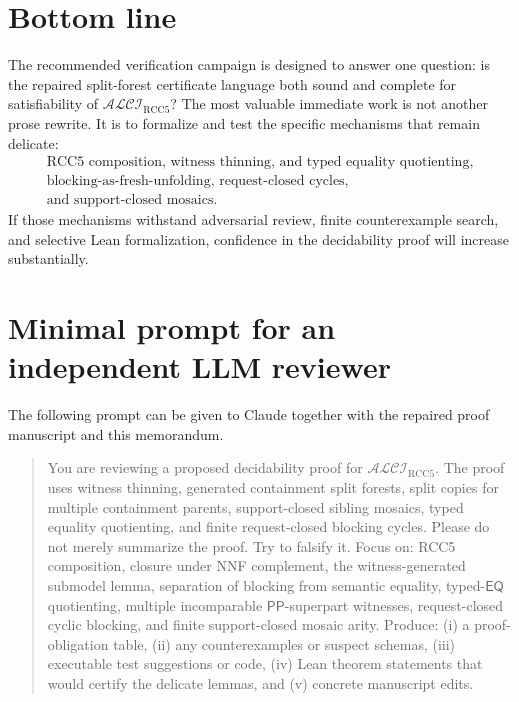 \documentclass[11pt]{article}
\newcommand{\ALCIRCC}{\ensuremath{\mathcal{ALCI}_{\mathrm{RCC5}}}}
\newcommand{\EQ}{\mathsf{EQ}}
\newcommand{\PP}{\mathsf{PP}}
\theoremstyle{definition}
\theoremstyle{plain}
\begin{document}
\section{Bottom line}

The recommended verification campaign is designed to answer one question: is the repaired split-forest certificate language both sound and complete for satisfiability of \ALCIRCC?  The most valuable immediate work is not another prose rewrite.  It is to formalize and test the specific mechanisms that remain delicate:
\[
\begin{array}{c}
\text{RCC5 composition, witness thinning, and typed equality quotienting,}\\[2pt]
\text{blocking-as-fresh-unfolding, request-closed cycles,}\\[2pt]
\text{and support-closed mosaics.}
\end{array}
\]
If those mechanisms withstand adversarial review, finite counterexample search, and selective Lean formalization, confidence in the decidability proof will increase substantially.

\appendix
\section{Minimal prompt for an independent LLM reviewer}

The following prompt can be given to Claude together with the repaired proof manuscript and this memorandum.

\begin{quote}\small
You are reviewing a proposed decidability proof for \(\mathcal{ALCI}_{\mathrm{RCC5}}\).  The proof uses witness thinning, generated containment split forests, split copies for multiple containment parents, support-closed sibling mosaics, typed equality quotienting, and finite request-closed blocking cycles.  Please do not merely summarize the proof.  Try to falsify it.  Focus on: RCC5 composition, closure under NNF complement, the witness-generated submodel lemma, separation of blocking from semantic equality, typed-\(\EQ\) quotienting, multiple incomparable \(\PP\)-superpart witnesses, request-closed cyclic blocking, and finite support-closed mosaic arity.  Produce: (i) a proof-obligation table, (ii) any counterexamples or suspect schemas, (iii) executable test suggestions or code, (iv) Lean theorem statements that would certify the delicate lemmas, and (v) concrete manuscript edits.
\end{quote}
\end{document}
